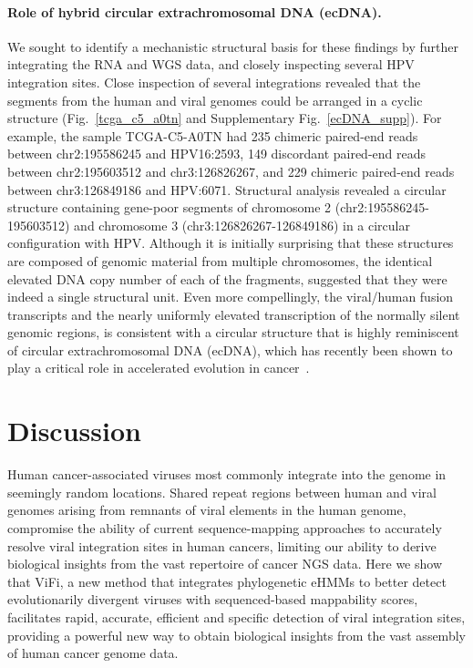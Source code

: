 \documentclass{bmcart}
\begin{document}
\paragraph{\textbf{Role of hybrid circular extrachromosomal DNA (ecDNA).}} We sought to identify a mechanistic structural basis for these
findings by further integrating the RNA and WGS data, and closely
inspecting several HPV integration sites. Close inspection of several
integrations revealed that the segments from the human and viral
genomes could be arranged in a cyclic structure (Fig.~\ref{tcga_c5_a0tn}
and Supplementary Fig.~\ref{ecDNA_supp}).  For example, the sample
TCGA-C5-A0TN had 235 chimeric paired-end reads between chr2:195586245
and HPV16:2593, 149 discordant paired-end reads between chr2:195603512
and chr3:126826267, and 229 chimeric paired-end reads between
chr3:126849186 and HPV:6071. Structural analysis revealed a circular
structure containing gene-poor segments of chromosome 2 (chr2:195586245-195603512) and 
chromosome 3 (chr3:126826267-126849186) in a circular
configuration with HPV. Although it is initially surprising that these
structures are composed of genomic material from multiple chromosomes,
the identical elevated DNA copy number of each of the fragments,
suggested that they were indeed a single structural unit. Even more
compellingly, the viral/human fusion transcripts and the nearly
uniformly elevated transcription of the normally silent genomic
regions, is consistent with a circular structure that is highly
reminiscent of circular extrachromosomal DNA (ecDNA), which has
recently been shown to play a critical role in accelerated evolution
in cancer~\cite{Turner2017}.

\section*{Discussion}
Human cancer-associated viruses most commonly integrate into the genome in seemingly random locations. Shared repeat regions between human and viral genomes arising from remnants of viral elements in the human genome, compromise the ability of current sequence-mapping approaches to accurately resolve viral integration sites in human cancers, limiting our ability to derive biological insights from the vast repertoire of cancer NGS data. Here we show that ViFi, a new method that integrates phylogenetic 
eHMMs to better detect evolutionarily divergent viruses with 
sequenced-based mappability scores, facilitates rapid, accurate, efficient and specific detection of viral integration sites, providing a powerful new way to obtain biological insights from the vast assembly of human cancer genome data. 
\end{document}
